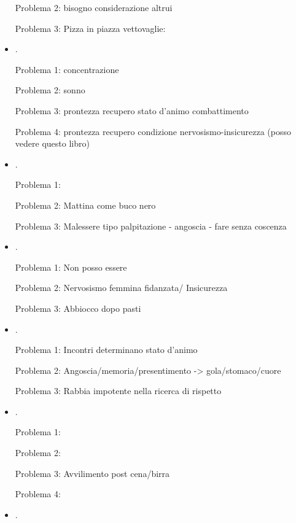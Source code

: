 \begin{itemize}
Problema 2: bisogno considerazione altrui

Problema 3: Pizza in piazza vettovaglie:  

\item {}.

Problema 1: concentrazione

Problema 2: sonno

Problema 3: prontezza recupero stato d'animo combattimento

Problema 4: prontezza recupero condizione nervosismo-insicurezza (posso vedere questo libro)

\item {}.

Problema 1: 

Problema 2: Mattina come buco nero

Problema 3: Malessere tipo palpitazione - angoscia - fare senza coscenza

\item {}.

Problema 1: Non posso essere 

Problema 2: Nervosismo femmina fidanzata/ Insicurezza

Problema 3: Abbiocco dopo pasti

\item {}.

Problema 1: Incontri determinano stato d'animo

Problema 2: Angoscia/memoria/presentimento -> gola/stomaco/cuore

Problema 3: Rabbia impotente nella ricerca di rispetto

\item {}.

Problema 1: 

Problema 2: 

Problema 3: Avvilimento post cena/birra

Problema 4: 

\item {}.


\end{itemize}
